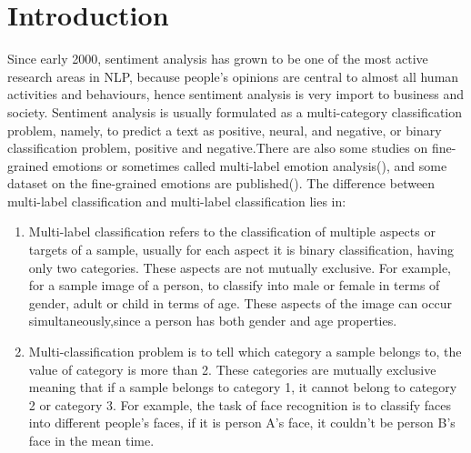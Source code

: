 \documentclass[12pt,twocolumn,letterpaper]{article}
\begin{document}
\section{Introduction}
Since early 2000, sentiment analysis has grown to be one of the most active research areas in NLP, because people’s opinions are central to almost all human activities and behaviours, hence sentiment analysis is very import to business and society. Sentiment analysis is usually formulated as a multi-category classification problem, namely, to predict a text as positive, neural, and negative, or binary classification problem, positive and negative.There are also some studies on fine-grained emotions or sometimes called multi-label emotion analysis(\cite{Ref2}), and some dataset on the fine-grained emotions are published(\cite{Ref1}).
The difference between multi-label classification and multi-label classification lies in:  
\begin{enumerate}
\item Multi-label classification refers to the classification of multiple aspects or targets of a sample, usually for each aspect it is binary classification, having only two categories. These aspects are not mutually exclusive. For example, for a sample image of a person, to classify into male or female in terms of gender, adult or child in terms of age. These aspects of the image can occur simultaneously,since a person has both gender and age properties.  
\item Multi-classification problem is to tell which category a sample belongs to, the value of category is more than 2. These categories are mutually exclusive meaning that if a sample belongs to category 1, it cannot belong to category 2 or category 3. For example, the task of face recognition is to classify faces into different people's faces, if it is person A's face, it couldn't be person B's face in the mean time.  
\end{enumerate}
\end{document}
